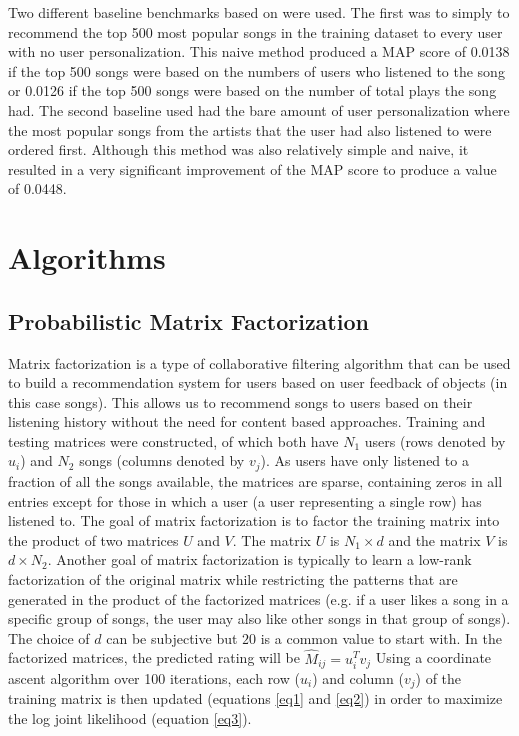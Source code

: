 \documentclass[11pt,preprint]{aastex}
\newcommand{\TRANSPOSE}{\ensuremath{T}}
\begin{document}
Two different baseline benchmarks based on \citet{McFee:2012:MSD:2187980.2188222} were used. The first was to simply to recommend the top 500 most popular songs in the training dataset to every user with no user personalization. This naive method produced a MAP score of 0.0138 if the top 500 songs were based on the numbers of users who listened to the song or 0.0126 if the top 500 songs were based on the number of total plays the song had. The second baseline used had the bare amount of user personalization where the most popular songs from the artists that the user had also listened to were ordered first. Although this method was also relatively simple and naive, it resulted in a very significant improvement of the MAP score to produce a value of 0.0448.

\section{Algorithms}

\subsection{Probabilistic Matrix Factorization}
Matrix factorization is a type of collaborative filtering algorithm that can be used to build a recommendation system for users based on user feedback of objects (in this case songs). This allows us to recommend songs to users based on their listening history without the need for content based approaches. 
Training and testing matrices were constructed, of which both have $N_1$ users (rows denoted by $u_i$) and $N_2$ songs (columns denoted by $v_j$). As users have only listened to a fraction of all the songs available, the matrices are sparse, containing zeros in all entries except for those in which a user (a user representing a single row) has listened to. The goal of matrix factorization is to factor the training matrix into the product of two matrices $U$ and $V$.  The matrix $U$ is $N_1 \times d$ and the matrix $V$ is $d \times N_2$. Another goal of matrix factorization is typically to learn a low-rank factorization of the original matrix while restricting the patterns that are generated in the product of the factorized matrices (e.g. if a user likes a song in a specific group of songs, the user may also like other songs in that group of songs). The choice of $d$ can be subjective but $20$ is a common value to start with. In the factorized matrices, the predicted rating will be $\hat{M}_{ij} = u_i^\TRANSPOSE  v_j$
Using a coordinate ascent algorithm over 100 iterations, each row ($u_i$) and column ($v_j$) of the training matrix is then updated (equations \ref{eq1} and \ref{eq2}) in order to maximize the log joint likelihood (equation \ref{eq3}).
\end{document}

